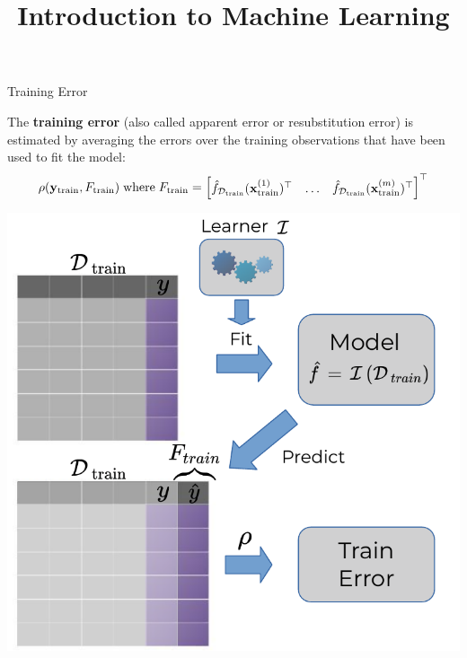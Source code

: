 




\newcommand{\titlefigure}{figure/eval_train_2}
\newcommand{\learninggoals}{
\item Understand the definition of training error
\item Understand why training error is no reliable estimator of future performance}


\title{Introduction to Machine Learning}
\date{}



\sloppy


\begin{vbframe}{Training Error}

The \textbf{training error} (also called apparent error or resubstitution error)
is estimated by averaging the errors over the training observations that have 
been used to fit the model:
\small
$$\rho(\yv_{\mathrm{train}}, F_{\textrm{train}})\;\text{where}\; F_{\textrm{train}} = 
\begin{bmatrix} \fhDtrain(\xi[1]_{\textrm{train}})^\top & \dots & \fhDtrain(\xi[m]_{\textrm{train}})^\top \end{bmatrix}^\top$$ 

\begin{center}
\includegraphics[width=.45\textwidth]{figure_man/train_error.pdf}
\end{center}

\end{vbframe}

